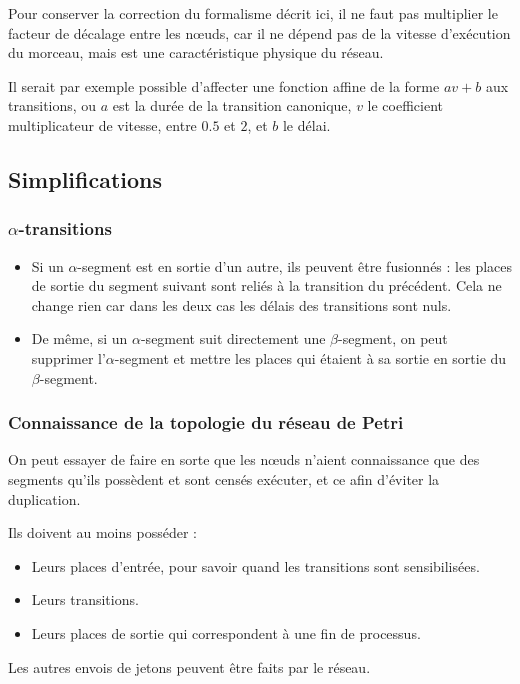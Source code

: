 Pour conserver la correction du formalisme décrit ici, il ne faut pas multiplier le facteur de décalage entre les nœuds, car il ne dépend pas de la vitesse d'exécution du morceau, mais est une caractéristique physique du réseau.

Il serait par exemple possible d'affecter une fonction affine de la forme $av + b$ aux transitions, ou $a$ est la durée de la transition canonique, $v$ le coefficient multiplicateur de vitesse, entre $0.5$ et $2$, et $b$ le délai. 

\subsection{Simplifications}
\subsubsection{$\alpha$-transitions}
\begin{itemize}
\item Si un $\alpha$-segment est en sortie d'un autre, ils peuvent être fusionnés : les places de sortie du segment suivant sont reliés à la transition du précédent. Cela ne change rien car dans les deux cas les délais des transitions sont nuls.

\item De même, si un $\alpha$-segment suit directement une $\beta$-segment, on peut supprimer l'$\alpha$-segment et mettre les places qui étaient à sa sortie en sortie du $\beta$-segment.
\end{itemize}
\subsubsection{Connaissance de la topologie du réseau de Petri}
On peut essayer de faire en sorte que les nœuds n'aient connaissance que des segments qu'ils possèdent et sont censés exécuter, et ce afin d'éviter la duplication.

Ils doivent au moins posséder : 
\begin{itemize}
\item Leurs places d'entrée, pour savoir quand les transitions sont sensibilisées.
\item Leurs transitions.
\item Leurs places de sortie qui correspondent à une fin de processus.
\end{itemize}

Les autres envois de jetons peuvent être faits par le réseau.

